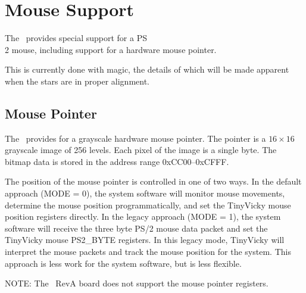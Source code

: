 \section*{Mouse Support}

The \jr\ provides special support for a PS\\2 mouse, including support for a hardware mouse pointer.

This is currently done with magic, the details of which will be made apparent when the stars are in proper alignment.

\subsection*{Mouse Pointer}

The \jr\ provides for a grayscale hardware mouse pointer. The pointer is a $16 \times 16$ grayscale image of 256 levels. Each pixel of the image is a single byte. The bitmap data is stored in the address range 0xCC00--0xCFFF.

The position of the mouse pointer is controlled in one of two ways. In the default approach (MODE = 0), the system software will monitor mouse movements, determine the mouse position programmatically, and set the TinyVicky mouse position registers directly. In the legacy approach (MODE = 1), the system software will receive the three byte PS/2 mouse data packet and set the TinyVicky mouse PS2\_BYTE registers. In this legacy mode, TinyVicky will interpret the mouse packets and track the mouse position for the system. This approach is less work for the system software, but is less flexible.

\begin{leftbar}
	NOTE: The \jr\ RevA board does not support the mouse pointer registers.
\end{leftbar}


